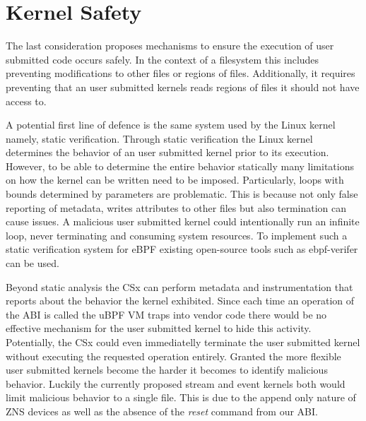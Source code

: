 

\section{Kernel Safety}

The last consideration proposes mechanisms to ensure the execution of user
submitted code occurs safely. In the context of a filesystem this includes
preventing modifications to other files or regions of files. Additionally, it
requires preventing that an user submitted kernels reads regions of files it
should not have access to.

A potential first line of defence is the same system used by the Linux kernel
namely, static verification. Through static verification the Linux kernel
determines the behavior of an user submitted kernel prior to its execution.
However, to be able to determine the entire behavior statically many limitations
on how the kernel can be written need to be imposed. Particularly, loops with
bounds determined by parameters are problematic. This is because not only
false reporting of metadata, writes attributes to other files but also
termination can cause issues. A malicious user submitted kernel could
intentionally run an infinite loop, never terminating and consuming system
resources. To implement such a static verification system for eBPF existing
open-source tools such as ebpf-verifer \cite{ebpf-verifier} can be used.

Beyond static analysis the CSx can perform metadata and instrumentation that
reports about the behavior the kernel exhibited. Since each time an operation of
the ABI is called the uBPF VM traps into vendor code there would be no effective
mechanism for the user submitted kernel to hide this activity. Potentially, the
CSx could even immediatelly terminate the user submitted kernel without
executing the requested operation entirely. Granted the more flexible user
submitted kernels become the harder it becomes to identify malicious behavior.
Luckily the currently proposed stream and event kernels both would limit
malicious behavior to a single file. This is due to the append only nature of
ZNS devices as well as the absence of the \textit{reset} command from our ABI.

